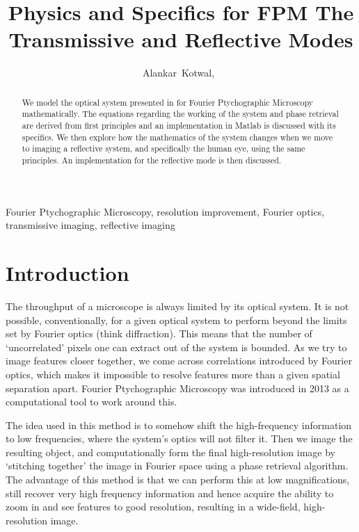 \documentclass[11pt,a4paper,journal]{IEEEtran}
\title{Physics and Specifics for FPM \linebreak The Transmissive and Reflective Modes}
\author{Alankar~Kotwal,~\IEEEmembership{Indian Institute of Technology Bombay}}
\begin{document}
\maketitle

\begin{abstract}
We model the optical system presented in \cite{FPMPaper} for Fourier Ptychographic Microscopy mathematically. The equations regarding the working of the system and phase retrieval are derived from first principles and an implementation in Matlab is discussed with its specifics. We then explore how the mathematics of the system changes when we move to imaging a reflective system, and specifically the human eye, using the same principles. An implementation for the reflective mode is then discussed.
\end{abstract}

\begin{keywords}
Fourier Ptychographic Microscopy, resolution improvement, Fourier optics, transmissive imaging, reflective imaging
\end{keywords}

\section{Introduction}
The throughput of a microscope is always limited by its optical system. It is not possible, conventionally, for a given optical system to perform beyond the limits set by Fourier optics (think diffraction). This means that the number of `uncorrelated' pixels one can extract out of the system is bounded. As we try to image features closer together, we come across correlations introduced by Fourier optics, which makes it impossible to resolve features more than a given spatial separation apart. Fourier Ptychographic Microscopy was introduced in 2013 as a computational tool to work around this.

The idea used in this method is to somehow shift the high-frequency information to low frequencies, where the system's optics will not filter it. Then we image the resulting object, and computationally form the final high-resolution image by `stitching together' the image in Fourier space using a phase retrieval algorithm. The advantage of this method is that we can perform this at low magnifications, still recover very high frequency information and hence acquire the ability to zoom in and see features to good resolution, resulting in a wide-field, high-resolution image.
\end{document}
